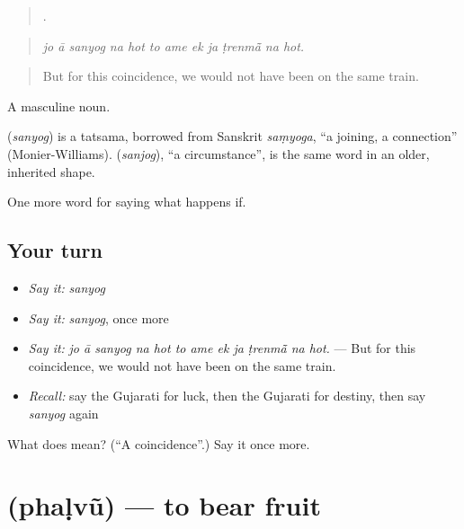 \begin{quote}
           .
\end{quote}

\begin{quote}
\emph{jo ā sanyog na hot to ame ek ja ṭrenmā̃ na hot.}
\end{quote}

\begin{quote}
But for this coincidence, we would not have been on the same train.
\end{quote}

A masculine noun.

\begin{cousinweb}
\textbf{} (\emph{sanyog}) is a tatsama, borrowed from Sanskrit \emph{saṃyoga}, \textquotedblleft{}a joining, a connection\textquotedblright{} (Monier-Williams). \textbf{} (\emph{sanjog}), \textquotedblleft{}a circumstance\textquotedblright{}, is the same word in an older, inherited shape.
\end{cousinweb}

\begin{grammarlens}[title={What you've built}]
One more word for saying what happens if.
\end{grammarlens}

\subsection*{Your turn}
\begin{itemize}
\raggedright
  \item \emph{Say it:} \emph{sanyog}
  \item \emph{Say it:} \emph{sanyog}, once more
  \item \emph{Say it:} \emph{jo ā sanyog na hot to ame ek ja ṭrenmā̃ na hot.} — But for this coincidence, we would not have been on the same train.
  \item \emph{Recall:} say the Gujarati for luck, then the Gujarati for destiny, then say \emph{sanyog} again
\end{itemize}

\begin{tcolorbox}[breakable,colback=teal!4,colframe=teal!35!black,title={Before you move on}]
What does  mean? (\textquotedblleft{}A coincidence\textquotedblright{}.) Say it once more.
\end{tcolorbox}
\section[\texorpdfstring{\gu{ફળવું} (phaḷvũ)}{ફળવું (phaḷvũ)}]{ (phaḷvũ) — to bear fruit}


